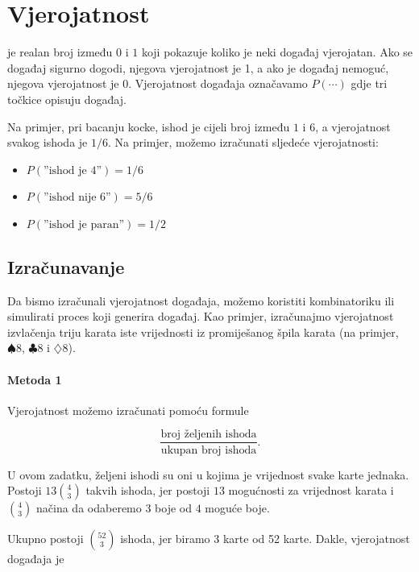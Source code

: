 \chapter{Vjerojatnost}


 je realan broj između $0$ i $1$
koji pokazuje koliko je neki događaj vjerojatan.
Ako se događaj sigurno dogodi,
njegova vjerojatnost je 1,
a ako je događaj nemoguć,
njegova vjerojatnost je 0.
Vjerojatnost događaja označavamo $P(\cdots)$
gdje tri točkice opisuju događaj.

Na primjer, pri bacanju kocke,
ishod je cijeli broj između $1$ i $6$,
a vjerojatnost svakog ishoda je $1/6$.
Na primjer, možemo izračunati sljedeće vjerojatnosti:

\begin{itemize}[noitemsep]
\item $P(\textrm{''ishod je 4''})=1/6$
\item $P(\textrm{''ishod nije 6''})=5/6$
\item $P(\textrm{''ishod je paran''})=1/2$
\end{itemize}

\section{Izračunavanje}

Da bismo izračunali vjerojatnost događaja,
možemo koristiti kombinatoriku
ili simulirati proces koji generira događaj.
Kao primjer, izračunajmo vjerojatnost
izvlačenja triju karata iste vrijednosti
iz promiješanog špila karata
(na primjer, $\spadesuit 8$, $\clubsuit 8$ i $\diamondsuit 8$).

\subsubsection*{Metoda 1}

Vjerojatnost možemo izračunati pomoću formule

\[\frac{\textrm{broj željenih ishoda}}{\textrm{ukupan broj ishoda}}.\]

U ovom zadatku, željeni ishodi su oni
u kojima je vrijednost svake karte jednaka.
Postoji $13 {4 \choose 3}$ takvih ishoda,
jer postoji $13$ mogućnosti za
vrijednost karata i ${4 \choose 3}$ načina da
odaberemo $3$ boje od $4$ moguće boje.

Ukupno postoji ${52 \choose 3}$ ishoda,
jer biramo 3 karte od 52 karte.
Dakle, vjerojatnost događaja je

